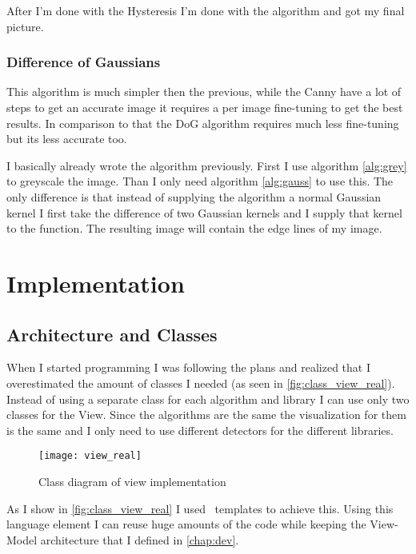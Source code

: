 After I'm done with the Hysteresis I'm done with the algorithm and got my final picture.

\subsubsection{Difference of Gaussians}

This algorithm is much simpler then the previous, while the \ac{Canny} have a lot of steps to get an accurate image it requires a per image fine-tuning to get the best results. In comparison to that the \ac{DoG} algorithm requires much less fine-tuning but its less accurate too.

I basically already wrote the algorithm previously. First I use algorithm \ref{alg:grey} to greyscale the image. Than I only need algorithm \ref{alg:gauss} to use this. The only difference is that instead of supplying the algorithm a normal Gaussian kernel I first take the difference of two Gaussian kernels and I supply that kernel to the function\cite{dog}. The resulting image will contain the edge lines of my image.

\section{Implementation}

\subsection{Architecture and Classes}
\label{chap:Imp_Arc}
When I started programming I was following the plans and realized that I overestimated the amount of classes I needed (as seen in \autoref{fig:class_view_real}). Instead of using a separate class for each algorithm and library I can use only two classes for the View. Since the algorithms are the same the visualization for them is the same and I only need to use different detectors for the different libraries.

\begin{figure}[H]
\centering
\texttt{[image: view\_real]}
\caption{Class diagram of view implementation}
\label{fig:class_view_real}
\end{figure}

As I show in \autoref{fig:class_view_real} I used \CC\ templates to achieve this. Using this language element I can reuse huge amounts of the code while keeping the View-Model architecture that I defined in \autoref{chap:dev}.

